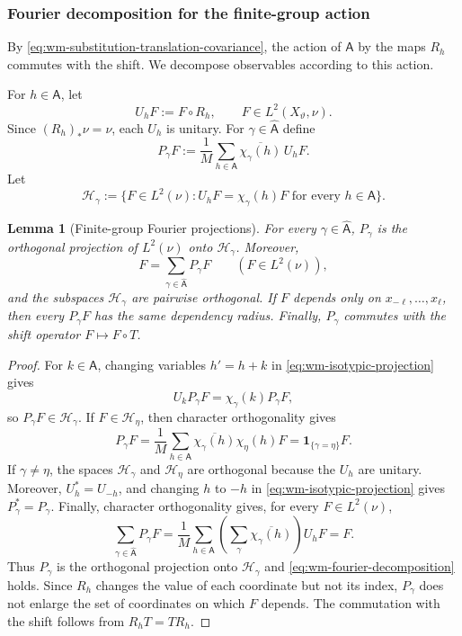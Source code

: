 \documentclass[11pt,reqno,a4paper]{amsart}
\numberwithin{equation}{section}
\theoremstyle{compact}
\newtheorem{lemma}[lemma]{Lemma}
\theoremstyle{definition}
\theoremstyle{definition}
\begin{document}
\subsubsection{Fourier decomposition for the finite-group action}
By \eqref{eq:wm-substitution-translation-covariance}, the action of
$\mathsf A$ by the maps $R_h$ commutes with the shift.  We decompose
observables according to this action.

For $h\in\mathsf A$, let
\[
  U_hF:=F\circ R_h,
  \qquad F\in L^2(X_\vartheta,\nu).
\]
Since $(R_h)_*\nu=\nu$, each $U_h$ is unitary.  For
$\gamma\in\widehat{\mathsf A}$ define
\begin{equation}\label{eq:wm-isotypic-projection}
  P_\gamma F
  :=\frac1M\sum_{h\in\mathsf A}
       \overline{\chi_\gamma(h)}\,U_hF.
\end{equation}
Let
\begin{equation}\label{eq:wm-character-subspace}
  \mathcal H_\gamma
  :=\{F\in L^2(\nu):U_hF=\chi_\gamma(h)F
       \text{ for every }h\in\mathsf A\}.
\end{equation}

\begin{lemma}[Finite-group Fourier projections]
\label{lem:wm-fourier-projections}
For every $\gamma\in\widehat{\mathsf A}$, $P_\gamma$ is the orthogonal
projection of $L^2(\nu)$ onto $\mathcal H_\gamma$.  Moreover,
\begin{equation}\label{eq:wm-fourier-decomposition}
  F=\sum_{\gamma\in\widehat{\mathsf A}}P_\gamma F
  \qquad(F\in L^2(\nu)),
\end{equation}
and the subspaces $\mathcal H_\gamma$ are pairwise orthogonal.  If $F$
depends only on $x_{-\ell},\ldots,x_\ell$, then every $P_\gamma F$ has the
same dependency radius.  Finally, $P_\gamma$ commutes with the shift
operator $F\mapsto F\circ T$.
\end{lemma}

\begin{proof}
For $k\in\mathsf A$, changing variables $h'=h+k$ in
\eqref{eq:wm-isotypic-projection} gives
\[
  U_kP_\gamma F=\chi_\gamma(k)P_\gamma F,
\]
so $P_\gamma F\in\mathcal H_\gamma$.  If $F\in\mathcal H_\eta$, then
character orthogonality gives
\[
  P_\gamma F
  =\frac1M\sum_{h\in\mathsf A}
    \overline{\chi_\gamma(h)}\chi_\eta(h)F
  =\mathbf 1_{\{\gamma=\eta\}}F.
\]
If $\gamma\neq\eta$, the spaces $\mathcal H_\gamma$ and
$\mathcal H_\eta$ are orthogonal because the $U_h$ are unitary.  Moreover,
$U_h^*=U_{-h}$, and changing $h$ to $-h$ in
\eqref{eq:wm-isotypic-projection} gives $P_\gamma^*=P_\gamma$.  Finally,
character orthogonality gives, for every $F\in L^2(\nu)$,
\[
  \sum_{\gamma\in\widehat{\mathsf A}}P_\gamma F
  =\frac1M\sum_{h\in\mathsf A}
     \left(\sum_\gamma\overline{\chi_\gamma(h)}\right)U_hF
  =F.
\]
Thus $P_\gamma$ is the orthogonal projection onto $\mathcal H_\gamma$ and
\eqref{eq:wm-fourier-decomposition} holds.  Since $R_h$ changes the value of
each coordinate but not its index, $P_\gamma$ does not enlarge the set of
coordinates on which $F$ depends.  The commutation with the shift follows
from $R_hT=TR_h$.
\end{proof}
\end{document}
